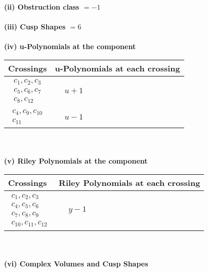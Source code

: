 \documentclass[1p]{elsarticle_modified}
\theoremstyle{definition}
\begin{document}
\flushleft \textbf{(ii) Obstruction class $= -1$}\\~\\
\flushleft \textbf{(iii) Cusp Shapes $= 6$}\\~\\
\newpage\renewcommand{\arraystretch}{1}
\flushleft \textbf{(iv) u-Polynomials at the component}\newline \\
\begin{tabular}{m{50pt}|m{274pt}}
Crossings & \hspace{64pt}u-Polynomials at each crossing \\
\hline $$\begin{aligned}c_{1},c_{2},c_{3}\\c_{5},c_{6},c_{7}\\c_{8},c_{12}\end{aligned}$$&$\begin{aligned}
&u+1
\end{aligned}$\\
\hline $$\begin{aligned}c_{4},c_{9},c_{10}\\c_{11}\end{aligned}$$&$\begin{aligned}
&u-1
\end{aligned}$\\
\hline
\end{tabular}\\~\\
\newpage\renewcommand{\arraystretch}{1}
\flushleft \textbf{(v) Riley Polynomials at the component}\newline \\
\begin{tabular}{m{50pt}|m{274pt}}
Crossings & \hspace{64pt}Riley Polynomials at each crossing \\
\hline $$\begin{aligned}c_{1},c_{2},c_{3}\\c_{4},c_{5},c_{6}\\c_{7},c_{8},c_{9}\\c_{10},c_{11},c_{12}\end{aligned}$$&$\begin{aligned}
&y-1
\end{aligned}$\\
\hline
\end{tabular}\\~\\
\newpage\flushleft \textbf{(vi) Complex Volumes and Cusp Shapes}
\end{document}
